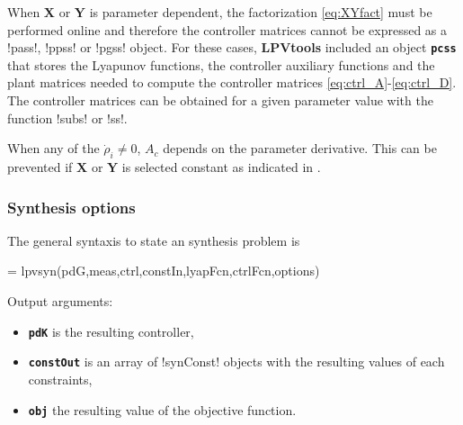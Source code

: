 \documentclass[fleqn,11pt]{article}
\newcommand{\lcode}[1]{\textbf{%
    \lstinline[style=mystyle]{#1}}}
\newcommand{\p}{\rho}
\newcommand{\Xu}{\mathbf{X}}
\newcommand{\Yu}{\mathbf{Y}}
\newcommand{\lpvtool}{\textbf{LPVtools}\xspace}
\begin{document}
When $\Xu$ or $\Yu$ is parameter dependent, the factorization \cref{eq:XYfact} must be performed online and therefore the controller matrices cannot be expressed as a !pass!, !ppss! or !pgss! object. For these cases, \lpvtool included an object \lcode{pcss} that stores the Lyapunov functions, the controller auxiliary functions and the plant matrices needed to compute the controller matrices \cref{eq:ctrl_A}-\cref{eq:ctrl_D}. The controller matrices can be obtained for a given parameter value with the function !subs! or !ss!.

When any of the $\dot\p_i\neq 0$, $A_c$ depends on the parameter derivative. This can be prevented if $\Xu$ or $\Yu$ is selected constant as indicated in \cite{apkarian_advanced_1998}.

\subsubsection{Synthesis options}\label{sssec:synOpt}

The general syntaxis to state an synthesis problem is
\begin{code}
 = lpvsyn(pdG,meas,ctrl,constIn,lyapFcn,ctrlFcn,options)
\end{code}
\noindent Output arguments:
\begin{itemize}
  \item \lcode{pdK} is the resulting controller,
  \item \lcode{constOut} is an array of !synConst! objects with the resulting values of each constraints,
  \item \lcode{obj} the resulting value of the objective function.
\end{itemize}
\end{document}
